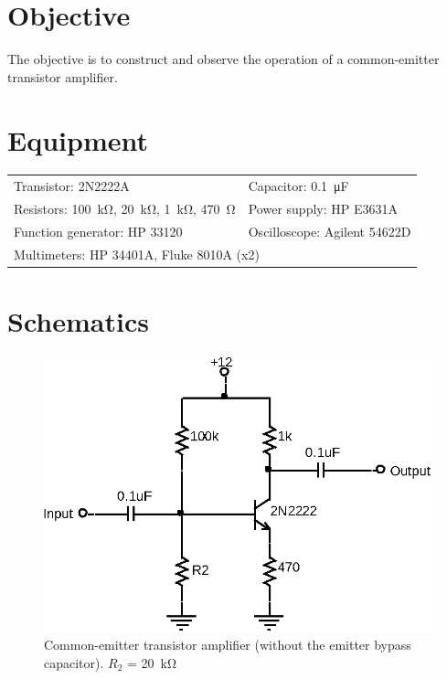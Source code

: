 

\section{Objective}

The objective is to construct and observe the operation of a common-emitter transistor amplifier.

\section{Equipment}

\begin{tabular}{ll}
  \centering
  Transistor: 2N2222A & Capacitor: \SI{0.1}{\micro\farad} \\
  Resistors: \SI{100}{\kilo\ohm}, \SI{20}{\kilo\ohm}, \SI{1}{\kilo\ohm}, \SI{470}{\ohm} & Power supply: HP E3631A \\
  Function generator: HP 33120 & Oscilloscope: Agilent 54622D \\
  \multicolumn{2}{l}{Multimeters: HP 34401A, Fluke 8010A (x2)} \\
\end{tabular}

\section{Schematics}

\begin{figure}[hbtp]
  \centering
  \includegraphics[width=.7\textwidth]{circuit}
  \caption{\label{fig:circuit} Common-emitter transistor amplifier (without the emitter bypass capacitor). $R_2$ = \SI{20}{\kilo\ohm}}
\end{figure}

